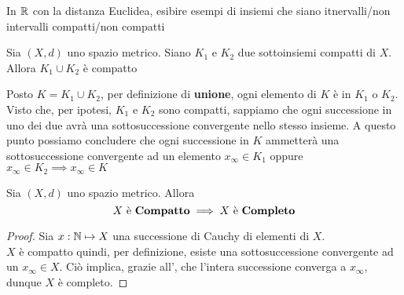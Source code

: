 \begin{exercise}
	In $\mathbb{R}$ con la distanza Euclidea, esibire esempi di insiemi che siano itnervalli/non intervalli compatti/non compatti
\end{exercise}
\begin{exercise}
	\label{ex:unione_compatti}
	Sia $(X,d)$ uno spazio metrico. Siano $K_1$ e $K_2$ due sottoinsiemi compatti di $X$. Allora $K_1 \cup K_2$ è compatto
	\begin{solution}
		Posto $K = K_1 \cup K_2$, per definizione di \textbf{unione}, ogni elemento di $K$ è in $K_1$ o $K_2$.\\
		Visto che, per ipotesi, $K_1$ e $K_2$ sono compatti, sappiamo che ogni successione in uno dei due avrà una sottosuccessione convergente nello stesso insieme. A questo punto possiamo concludere che ogni successione in $K$ ammetterà una sottosuccessione convergente ad un elemento $x_\infty \in K_1$ oppure $x_\infty \in K_2 \implies x_\infty \in K$
	\end{solution}
\end{exercise}

\begin{proposition}
	Sia $(X,d)$ uno spazio metrico. Allora
	\[X \text{ è \textbf{Compatto}} \implies X \text{ è \textbf{Completo}}\]
	\begin{proof}
		Sia $x: \mathbb{N} \mapsto X$ una successione di Cauchy di elementi di $X$.\\
		$X$ è compatto quindi, per definizione, esiste una sottosuccessione convergente ad un $x_\infty \in X$. Ciò implica, grazie all', che l'intera successione converga a $x_\infty$, dunque $X$ è completo.
	\end{proof}
\end{proposition}

